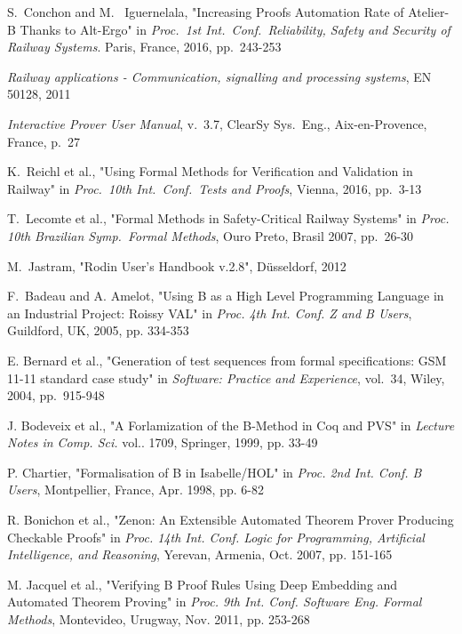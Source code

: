 \documentclass[11pt,journal]{IEEEtran}
\begin{document}
	\IEEEPARstart{}{} 
	
	\begin{thebibliography}{1}
		S.~Conchon and M.~ Iguernelala, "Increasing Proofs Automation Rate of Atelier-B Thanks to Alt-Ergo" in \emph{Proc.~1st Int.~Conf.~Reliability, Safety and Security of Railway Systems}. Paris, France, 2016, pp.~243-253
		
		\emph{Railway applications - Communication, signalling and processing systems}, EN 50128, 2011
		
		\emph{Interactive Prover User Manual}, v.~3.7, ClearSy Sys.~Eng., Aix-en-Provence, France, p.~27
		
		K.~Reichl et al., "Using Formal Methods for Verification and Validation in Railway" in \emph{Proc.~10th Int.~Conf.~Tests and Proofs}, Vienna, 2016, pp.~3-13
		
		T.~Lecomte et al., "Formal Methods in Safety-Critical Railway Systems" in \emph{Proc. 10th Brazilian Symp.~Formal Methods}, Ouro Preto, Brasil 2007, pp.~26-30
		
		M.~Jastram, "Rodin User's Handbook v.2.8", D\"{u}sseldorf, 2012
		
		F.~Badeau and A. Amelot, "Using B as a High Level Programming Language in an Industrial Project: Roissy VAL" in \emph{Proc. 4th Int. Conf. Z and B Users}, Guildford, UK, 2005, pp. 334-353
		
		E. Bernard et al., "Generation of test sequences from formal specifications: GSM 11-11 standard case study" in \emph{Software: Practice and Experience}, vol.~34, Wiley, 2004, pp.~915-948
		
		J. Bodeveix et al., "A Forlamization of the B-Method in Coq and PVS" in \emph{Lecture Notes in Comp. Sci.} vol.. 1709, Springer, 1999, pp. 33-49
		
		P. Chartier, "Formalisation of B in Isabelle/HOL" in \emph{Proc. 2nd Int. Conf. B Users}, Montpellier, France, Apr. 1998, pp. 6-82
		
		R. Bonichon et al., "Zenon: An Extensible Automated Theorem Prover Producing Checkable Proofs" in \emph{Proc. 14th Int. Conf. Logic for Programming, Artificial Intelligence, and Reasoning}, Yerevan, Armenia, Oct. 2007, pp. 151-165
		
		M. Jacquel et al., "Verifying B Proof Rules Using Deep Embedding and Automated Theorem Proving" in \emph{Proc. 9th Int. Conf. Software Eng. Formal Methods}, Montevideo, Urugway, Nov. 2011, pp. 253-268
		

\end{thebibliography}
\end{document}
